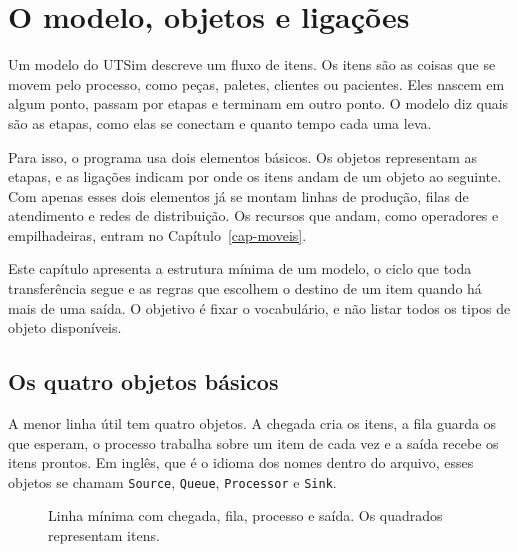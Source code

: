 \chapter{O modelo, objetos e ligações}
\label{cap-modelo}


Um modelo do UTSim descreve um fluxo de itens. Os itens são as coisas que se movem pelo processo, como peças, paletes, clientes ou pacientes. Eles nascem em algum ponto, passam por etapas e terminam em outro ponto. O modelo diz quais são as etapas, como elas se conectam e quanto tempo cada uma leva.

Para isso, o programa usa dois elementos básicos. Os objetos representam as etapas, e as ligações indicam por onde os itens andam de um objeto ao seguinte. Com apenas esses dois elementos já se montam linhas de produção, filas de atendimento e redes de distribuição. Os recursos que andam, como operadores e empilhadeiras, entram no Capítulo~\ref{cap-moveis}.

Este capítulo apresenta a estrutura mínima de um modelo, o ciclo que toda transferência segue e as regras que escolhem o destino de um item quando há mais de uma saída. O objetivo é fixar o vocabulário, e não listar todos os tipos de objeto disponíveis.

\section{Os quatro objetos básicos}

A menor linha útil tem quatro objetos. A chegada cria os itens, a fila guarda os que esperam, o processo trabalha sobre um item de cada vez e a saída recebe os itens prontos. Em inglês, que é o idioma dos nomes dentro do arquivo, esses objetos se chamam \texttt{Source}, \texttt{Queue}, \texttt{Processor} e \texttt{Sink}.

\begin{figure}[ht]
\centering
{}
\caption{Linha mínima com chegada, fila, processo e saída. Os quadrados representam itens.}
\label{fig-linha}
\end{figure}


